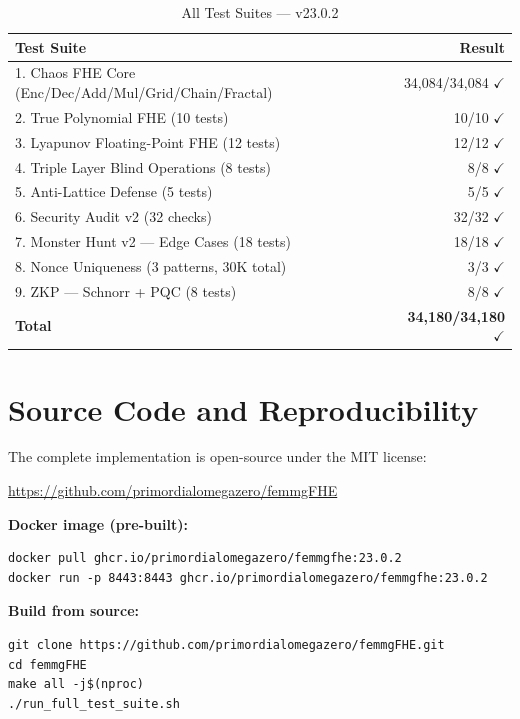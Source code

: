 \documentclass[11pt,a4paper]{article}
\begin{document}
\begin{table}[H]
\centering
\caption{All Test Suites — v23.0.2}
\label{tab:all_tests}
\begin{tabular}{@{}lr@{}}
\toprule
\textbf{Test Suite} & \textbf{Result} \\
\midrule
1. Chaos FHE Core (Enc/Dec/Add/Mul/Grid/Chain/Fractal) & 34,084/34,084 $\checkmark$ \\
2. True Polynomial FHE (10 tests) & 10/10 $\checkmark$ \\
3. Lyapunov Floating-Point FHE (12 tests) & 12/12 $\checkmark$ \\
4. Triple Layer Blind Operations (8 tests) & 8/8 $\checkmark$ \\
5. Anti-Lattice Defense (5 tests) & 5/5 $\checkmark$ \\
6. Security Audit v2 (32 checks) & 32/32 $\checkmark$ \\
7. Monster Hunt v2 — Edge Cases (18 tests) & 18/18 $\checkmark$ \\
8. Nonce Uniqueness (3 patterns, 30K total) & 3/3 $\checkmark$ \\
9. ZKP — Schnorr + PQC (8 tests) & 8/8 $\checkmark$ \\
\midrule
\textbf{Total} & \textbf{34,180/34,180} $\checkmark$ \\
\bottomrule
\end{tabular}
\end{table}

\section{Source Code and Reproducibility}

The complete implementation is open-source under the MIT license:

\begin{center}
\url{https://github.com/primordialomegazero/femmgFHE}
\end{center}

\textbf{Docker image (pre-built):}
\begin{verbatim}
docker pull ghcr.io/primordialomegazero/femmgfhe:23.0.2
docker run -p 8443:8443 ghcr.io/primordialomegazero/femmgfhe:23.0.2
\end{verbatim}

\textbf{Build from source:}
\begin{verbatim}
git clone https://github.com/primordialomegazero/femmgFHE.git
cd femmgFHE
make all -j$(nproc)
./run_full_test_suite.sh
\end{verbatim}
\end{document}
